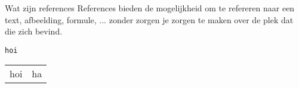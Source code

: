\begin{frame}{Wat zijn references}
	References bieden de mogelijkheid om te refereren naar een text, afbeelding, formule, ... zonder zorgen je zorgen te maken over de plek dat die zich bevind.

\begin{verbatim}
hoi
\end{verbatim} 
\begin{tabular}{l r}
hoi
& 
ha
\end{tabular}
\end{frame}



%
